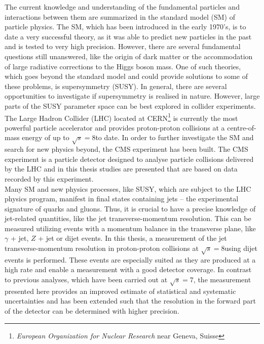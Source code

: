 The current knowledge and understanding of the fundamental particles and interactions between them are summarized in the standard model (SM) of particle physics. The SM, which has been introduced in the early 1970's, is to date a very successful theory, as it was able to predict new particles in the past and is tested to very high precision. However, there are several fundamental questions still unanswered, like the origin of dark matter or the accommodation of large radiative corrections to the Higgs boson mass. One of such theories, which goes beyond the standard model and could provide solutions to some of these problems, is supersymmetry (SUSY). In general, there are several opportunities to investigate if supersymmetry is realised in nature. However, large parts of the SUSY parameter space can be best explored in collider experiments. \\
The Large Hadron Collider (LHC) located at CERN\footnote{\textit{European Organization for Nuclear Research} near Geneva, Suisse} is currently the most powerful particle accelerator and provides proton-proton collisions at a centre-of-mass energy of up to $\sqrt{s} = 8$\tev to date. In order to further investigate the SM and search for new physics beyond, the CMS experiment has been built. The CMS experiment is a particle detector designed to analyse particle collisions delivered by the LHC and in this thesis studies are presented that are based on data recorded by this experiment. \\ 
Many SM and new physics processes, like SUSY, which are subject to the LHC physics program, manifest in final states containing jets -- the experimental signature of quarks and gluons. Thus, it is crucial to have a precise knowledge of jet-related quantities, like the jet transverse-momentum resolution. This can be measured utilizing events with a momentum balance in the transverse plane, like $\gamma$ + jet, $Z$ + jet or dijet events. In this thesis, a measurement of the jet transverse-momentum resolution in proton-proton collisions at $\sqrt{s} = 8$\tev using dijet events is performed. These events are especially suited as they are produced at a high rate and enable a measurement with a good detector coverage. In contrast to previous analyses, which have been carried out at $\sqrt{s} = 7$\tev, the measurement presented here provides an improved estimate of statistical and systematic uncertainties and has been extended such that the resolution in the forward part of the detector can be determined with higher precision. \\
